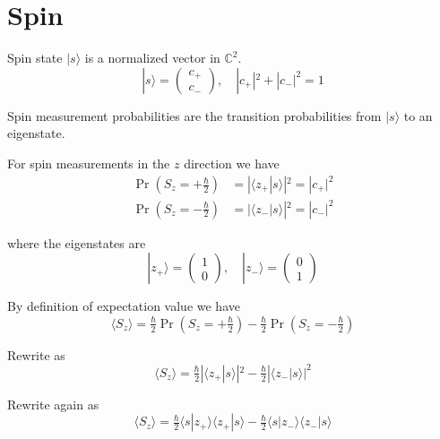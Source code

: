 

\section*{Spin}

Spin state $|s\rangle$ is a normalized vector in $\mathbb C^2$.
\begin{equation*}
|s\rangle=\begin{pmatrix}c_+\\c_-\end{pmatrix},\quad|c_+|^2+|c_-|^2=1
\end{equation*}

Spin measurement probabilities are the transition probabilities from $|s\rangle$ to an eigenstate.

\bigskip
For spin measurements in the $z$ direction we have
\begin{align*}
\Pr\left(S_z=+\tfrac{\hbar}{2}\right)&=|\langle z_+|s\rangle|^2=|c_+|^2
\\
\Pr\left(S_z=-\tfrac{\hbar}{2}\right)&=|\langle z_-|s\rangle|^2=|c_-|^2
\end{align*}

where the eigenstates are
\begin{equation*}
|z_+\rangle=\begin{pmatrix}1\\0\end{pmatrix},\quad
|z_-\rangle=\begin{pmatrix}0\\1\end{pmatrix}
\end{equation*}

By definition of expectation value we have
\begin{equation*}
\langle S_z\rangle
=\tfrac{\hbar}{2}\Pr\left(S_z=+\tfrac{\hbar}{2}\right)
-\tfrac{\hbar}{2}\Pr\left(S_z=-\tfrac{\hbar}{2}\right)
\end{equation*}

Rewrite as
\begin{equation*}
\langle S_z\rangle=\tfrac{\hbar}{2}|\langle z_+|s\rangle|^2-\tfrac{\hbar}{2}|\langle z_-|s\rangle|^2
\end{equation*}

Rewrite again as
\begin{equation*}
\langle S_z\rangle
=\tfrac{\hbar}{2}\langle s|z_+\rangle\langle z_+|s\rangle
-\tfrac{\hbar}{2}\langle s|z_-\rangle\langle z_-|s\rangle
\end{equation*}

